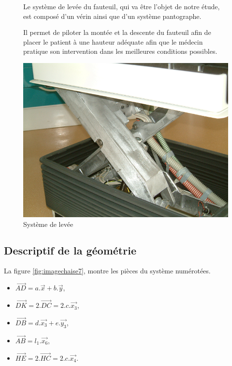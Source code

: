 \begin{figure}[htbp]
\begin{minipage}[c]{.5\linewidth}
Le système de levée du fauteuil, qui va être l'objet de notre étude, est composé d'un vérin ainsi que d'un système pantographe.

Il permet de piloter la montée et la descente du fauteuil afin de placer le patient à une hauteur adéquate afin que le médecin pratique son intervention dans les meilleures conditions possibles.
\end{minipage}
\hfill
\begin{minipage}[c]{.45\linewidth}
\begin{center}
\includegraphics[width=\linewidth]{img/detail_chaise.png}
\caption{Système de levée}
\label{fig:imagechaise2}
\end{center}
\end{minipage}
\end{figure}

\newpage

\subsection{Descriptif de la géométrie}

La figure \ref{fig:imagechaise7}, montre les pièces du système numérotées.

\begin{itemize}
 \item $\overrightarrow{AD}=a.\overrightarrow{x}+b.\overrightarrow{y}$,
 \item $\overrightarrow{DK}=2.\overrightarrow{DC}=2.c.\overrightarrow{x_3}$,
 \item $\overrightarrow{DB}=d.\overrightarrow{x_3}+e.\overrightarrow{y_3}$,
 \item $\overrightarrow{AB}=l_1.\overrightarrow{x_6}$,
 \item $\overrightarrow{HE}=2.\overrightarrow{HC}=2.c.\overrightarrow{x_4}$.
\end{itemize}

